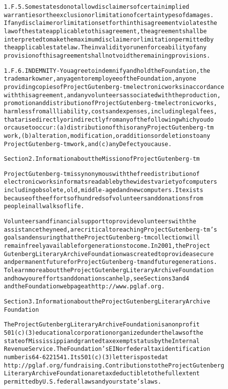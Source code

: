\documentclass[12pt,oneside]{book}[2007/10/19]
\newenvironment{PGtext}{%
  \begin{alltt}
  \fontsize{9}{10}\ttfamily\selectfont}%
  {\end{alltt}%
}
\begin{document}
\begin{PGtext}
1.F.5.  Some states do not allow disclaimers of certain implied
warranties or the exclusion or limitation of certain types of damages.
If any disclaimer or limitation set forth in this agreement violates the
law of the state applicable to this agreement, the agreement shall be
interpreted to make the maximum disclaimer or limitation permitted by
the applicable state law.  The invalidity or unenforceability of any
provision of this agreement shall not void the remaining provisions.

1.F.6.  INDEMNITY - You agree to indemnify and hold the Foundation, the
trademark owner, any agent or employee of the Foundation, anyone
providing copies of Project Gutenberg-tm electronic works in accordance
with this agreement, and any volunteers associated with the production,
promotion and distribution of Project Gutenberg-tm electronic works,
harmless from all liability, costs and expenses, including legal fees,
that arise directly or indirectly from any of the following which you do
or cause to occur: (a) distribution of this or any Project Gutenberg-tm
work, (b) alteration, modification, or additions or deletions to any
Project Gutenberg-tm work, and (c) any Defect you cause.


Section  2.  Information about the Mission of Project Gutenberg-tm

Project Gutenberg-tm is synonymous with the free distribution of
electronic works in formats readable by the widest variety of computers
including obsolete, old, middle-aged and new computers.  It exists
because of the efforts of hundreds of volunteers and donations from
people in all walks of life.

Volunteers and financial support to provide volunteers with the
assistance they need, are critical to reaching Project Gutenberg-tm's
goals and ensuring that the Project Gutenberg-tm collection will
remain freely available for generations to come.  In 2001, the Project
Gutenberg Literary Archive Foundation was created to provide a secure
and permanent future for Project Gutenberg-tm and future generations.
To learn more about the Project Gutenberg Literary Archive Foundation
and how your efforts and donations can help, see Sections 3 and 4
and the Foundation web page at http://www.pglaf.org.


Section 3.  Information about the Project Gutenberg Literary Archive
Foundation

The Project Gutenberg Literary Archive Foundation is a non profit
501(c)(3) educational corporation organized under the laws of the
state of Mississippi and granted tax exempt status by the Internal
Revenue Service.  The Foundation's EIN or federal tax identification
number is 64-6221541.  Its 501(c)(3) letter is posted at
http://pglaf.org/fundraising.  Contributions to the Project Gutenberg
Literary Archive Foundation are tax deductible to the full extent
permitted by U.S. federal laws and your state's laws.


\end{PGtext}
\end{document}
